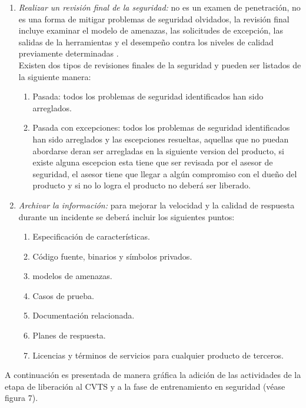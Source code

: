 \documentclass[runningheads,a4paper]{llncs}
\begin{document}
\begin{enumerate}
\begin{enumerate}
	\item \textit{Realizar un revisión final de la seguridad: }no es un examen de penetración, no es una forma de mitigar problemas de seguridad olvidados, la revisión final incluye examinar el modelo de amenazas,  
las solicitudes de excepción, las salidas de la herramientas y el desempeño contra los niveles de calidad previamente determinadas \cite{SDLWhitePaper}. \\

Existen dos tipos de revisiones finales de la seguridad y pueden ser listados de la siguiente manera:\\
	\begin{enumerate}
		\item Pasada: todos los problemas de seguridad identificados han sido arreglados.
		\item Pasada con excepciones: todos los problemas de seguridad identificados han sido arreglados y las escepciones resueltas, aquellas que no puedan abordarse deran ser arregladas en la siguiente version del producto, si existe alguna escepcion esta tiene que ser revisada por el asesor de seguridad, el asesor tiene que llegar a algún compromiso con el dueño del producto y si no lo logra el producto no deberá ser liberado. \\
\end{enumerate}
	
\item \textit{Archivar la información: }para mejorar la velocidad y la calidad de respuesta durante un incidente se deberá incluir los siguientes puntos: \\
	\begin{enumerate}
		\item Especificación de características.		
		\item Código fuente, binarios y símbolos privados.		
		\item modelos de amenazas.		
		\item Casos de prueba.		
		\item Documentación relacionada.		
		\item Planes de respuesta.	
		\item Licencias y términos de servicios para cualquier producto de terceros.\\
	\end{enumerate}

\end{enumerate}

A continuación es presentada de manera gráfica la adición de las actividades de la etapa de liberación al \gls{CVTS} y a la fase de entrenamiento en seguridad (véase figura 7).\\


\end{enumerate}
\end{document}
